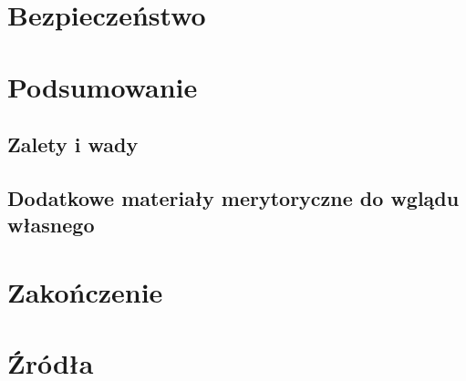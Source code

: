 \documentclass[10pt,a4paper]{report}
\begin{document}
\chapter{Bezpieczeństwo}

	
\chapter{Podsumowanie}

	\section{Zalety i wady}
	
	\section{Dodatkowe materiały merytoryczne do wglądu własnego}
	
\chapter{Zakończenie}
\newpage \newpage
\chapter{Źródła}
\end{document}
